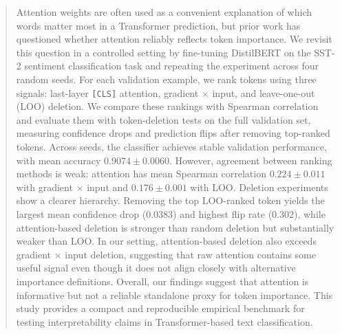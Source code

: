 \begin{abstract}
Attention weights are often used as a convenient explanation of which words matter most in a Transformer prediction, but prior work has questioned whether attention reliably reflects token importance. We revisit this question in a controlled setting by fine-tuning DistilBERT on the SST-2 sentiment classification task and repeating the experiment across four random seeds. For each validation example, we rank tokens using three signals: last-layer \texttt{[CLS]} attention, gradient $\times$ input, and leave-one-out (LOO) deletion. We compare these rankings with Spearman correlation and evaluate them with token-deletion tests on the full validation set, measuring confidence drops and prediction flips after removing top-ranked tokens. Across seeds, the classifier achieves stable validation performance, with mean accuracy $0.9074 \pm 0.0060$. However, agreement between ranking methods is weak: attention has mean Spearman correlation $0.224 \pm 0.011$ with gradient $\times$ input and $0.176 \pm 0.001$ with LOO. Deletion experiments show a clearer hierarchy. Removing the top LOO-ranked token yields the largest mean confidence drop ($0.0383$) and highest flip rate ($0.302$), while attention-based deletion is stronger than random deletion but substantially weaker than LOO. In our setting, attention-based deletion also exceeds gradient $\times$ input deletion, suggesting that raw attention contains some useful signal even though it does not align closely with alternative importance definitions. Overall, our findings suggest that attention is informative but not a reliable standalone proxy for token importance. This study provides a compact and reproducible empirical benchmark for testing interpretability claims in Transformer-based text classification.
\end{abstract}

